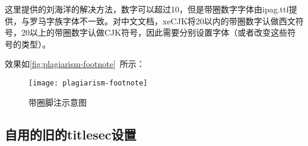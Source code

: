 这里提供的刘海洋的解决方法，数字可以超过10，但是带圈数字字体由ipag.ttf提供，与罗马字族字体不一致。对中文文档，xeCJK将20以内的带圈数字认做西文符号，20以上的带圈数字认做CJK符号，因此需要分别设置字体（或者改变这些符号的类型）。

\begin{latex}
\usepackage{xunicode-addon}
\newfontfamily{} %
\newCJKfontfamily{} %
\renewcommand\thefootnote{{\fnmarkfont\fnCJKmarkfont\textcircled{\arabic{footnote}}}}
\end{latex}

效果如\autoref{fig:plagiarism-footnote}~所示：

\begin{figure}[!htbp]
    \centering
    \texttt{[image: plagiarism-footnote]}
    \caption{带圈脚注示意图}
    \label{fig:plagiarism-footnote}
\end{figure}

\subsection{自用的旧的titlesec设置}




